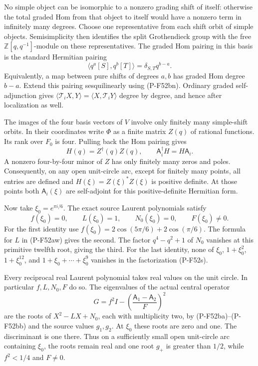 No simple object can be isomorphic to a nonzero grading
shift of itself: otherwise the total graded Hom from
that object to itself would have a nonzero term in
infinitely many degrees. Choose one representative from
each shift orbit of simple objects. Semisimplicity then
identifies the split Grothendieck group with the free
$\mathbb Z[q,q^{-1}]$-module on these representatives.
The graded Hom pairing in this basis is the standard
Hermitian pairing
\[
       \langle q^a[S],q^b[T]\rangle
                          =\delta_{S,T}q^{b-a}.
                                                               \tag{P-F52bo}
\]
Equivalently, a map between pure shifts of degrees $a,b$
has graded Hom degree $b-a$. Extend this pairing
sesquilinearly using (P-F52bn).
Ordinary graded self-adjunction gives
$\langle\mathscr T_i X,Y\rangle
 =\langle X,\mathscr T_iY\rangle$ degree by degree,
and hence after localization as well.

The images of the four basis vectors of $V$ involve only
finitely many simple-shift orbits. In their coordinates
write $\Phi$ as a finite matrix $Z(q)$ of rational
functions. Its rank over $F_0$ is four. Pulling back the
Hom pairing gives
\[
       H(q)=Z^{\dagger}(q)Z(q),\qquad
       \mathsf A_i^{\dagger}H=H\mathsf A_i.
                                                               \tag{P-F52bp}
\]
A nonzero four-by-four minor of $Z$ has only finitely
many zeros and poles. Consequently, on any open unit-circle
arc, except for finitely many points, all entries are
defined and
$H(\xi)=Z(\xi)^*Z(\xi)$ is positive definite.
At those points both $\mathsf A_i(\xi)$ are self-adjoint
for this positive-definite Hermitian form.

Now take $\xi_0=e^{\pi i/6}$. The exact source Laurent
polynomials satisfy
\[
       f(\xi_0)=0,\qquad L(\xi_0)=1,\qquad
       N_0(\xi_0)=0,\qquad F(\xi_0)\ne0.
                                                               \tag{P-F52bq}
\]
For the first identity use
$f(\xi_0)=2\cos(5\pi/6)+2\cos(\pi/6)$.
The formula for $L$ in (P-F52aw) gives the second.
The factor $q^4-q^2+1$ of $N_0$ vanishes at this
primitive twelfth root, giving the third.
For the last identity, none of
$\xi_0$, $1+\xi_0^2$, $1+\xi_0^{12}$, and
$1+\xi_0+\cdots+\xi_0^9$
vanishes in the factorization (P-F52s).

Every reciprocal real Laurent polynomial takes real
values on the unit circle. In particular $f,L,N_0,F$
do so. The eigenvalues of the actual central operator
\[
        G=f^2I-
          \left(\frac{\mathsf A_1-\mathsf A_2}{F}\right)^2
                                                               \tag{P-F52br}
\]
are the roots of $X^2-LX+N_0$, each with multiplicity
two, by (P-F52ba)--(P-F52bb) and the source values
$g_1,g_2$. At $\xi_0$ these roots are zero and one.
The discriminant is one there. Thus on a sufficiently
small open unit-circle arc containing $\xi_0$, the roots
remain real and one root $g_+$ is greater than $1/2$,
while $f^2<1/4$ and $F\ne0$.

